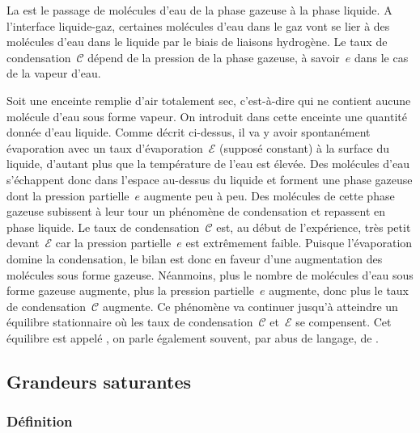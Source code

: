 \sk
La  est le passage de molécules d'eau de la phase gazeuse à la phase liquide. A l'interface liquide-gaz, certaines molécules d'eau dans le gaz vont se lier à des molécules d'eau dans le liquide par le biais de liaisons hydrogène. Le taux de condensation~$\mathcal{C}$ dépend de la pression de la phase gazeuse, à savoir~$e$ dans le cas de la vapeur d'eau. 

\sk
Soit une enceinte remplie d'air totalement sec, c'est-à-dire qui ne contient aucune molécule d'eau sous forme vapeur. On introduit dans cette enceinte une quantité donnée d'eau liquide. Comme décrit ci-dessus, il va y avoir spontanément évaporation avec un taux d'évaporation~$\mathcal{E}$ (supposé constant) à la surface du liquide, d'autant plus que la température de l'eau est élevée. Des molécules d'eau s'échappent donc dans l'espace au-dessus du liquide et forment une phase gazeuse dont la pression partielle~$e$ augmente peu à peu. Des molécules de cette phase gazeuse subissent à leur tour un phénomène de condensation et repassent en phase liquide. Le taux de condensation~$\mathcal{C}$ est, au début de l'expérience, très petit devant~$\mathcal{E}$ car la pression partielle~$e$ est extrêmement faible. Puisque l'évaporation domine la condensation, le bilan est donc en faveur d'une augmentation des molécules sous forme gazeuse. Néanmoins, plus le nombre de molécules d'eau sous forme gazeuse augmente, plus la pression partielle~$e$ augmente, donc plus le taux de condensation~$\mathcal{C}$ augmente. Ce phénomène va continuer jusqu'à atteindre un équilibre stationnaire où les taux de condensation~$\mathcal{C}$ et~$\mathcal{E}$ se compensent. Cet équilibre est appelé , on parle également souvent, par abus de langage, de .%

\sk
\subsection{Grandeurs saturantes}

\sk
\subsubsection{Définition}

